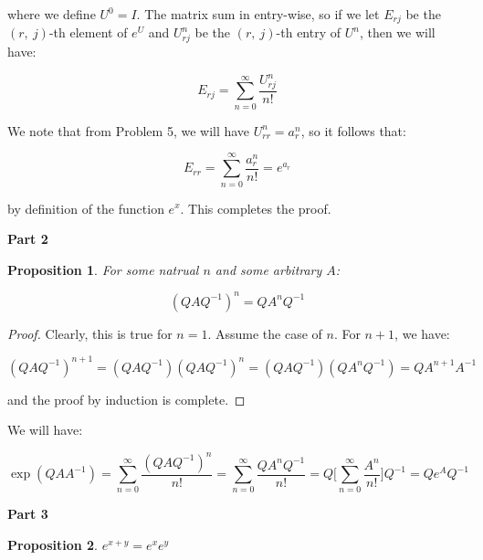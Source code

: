 \documentclass[10pt, oneside]{article}
\newtheorem{prop}{Proposition}
\begin{document}
    where we define $U^0 = I$. The matrix sum in entry-wise, so if we let $E_{rj}$ be the $(r, \ j)$-th element
    of $e^U$ and $U^n_{rj}$ be the $(r, \ j)$-th entry of $U^n$, then we will have:

    $$E_{rj} = \displaystyle\sum_{n = 0}^{\infty} \frac{U^{n}_{rj}}{n!}$$

    We note that from Problem 5, we will have $U^{n}_{rr} = a_{r}^n$, so it follows that:

    $$E_{rr} = \displaystyle\sum_{n = 0}^{\infty} \frac{a_{r}^n}{n!} = e^{a_r}$$

    by definition of the function $e^x$. This completes the proof.
    \newline

    \textbf{Part 2}
    \newline

    \begin{prop}
      For some natrual $n$ and some arbitrary $A$:

      $$(Q A Q^{-1})^n = Q A^n Q^{-1}$$
    \end{prop}

    \begin{proof}
      Clearly, this is true for $n = 1$. Assume the case of $n$. For $n + 1$, we have:

      $$(Q A Q^{-1})^{n + 1} = (Q A Q^{-1}) (Q A Q^{-1})^{n} = (Q A Q^{-1})(Q A^n Q^{-1}) = Q A^{n + 1} A^{-1}$$

      and the proof by induction is complete.
      \end{proof}

    We will have:

    $$\exp(Q A A^{-1}) = \displaystyle\sum_{n = 0}^{\infty} \frac{(Q A Q^{-1})^n}{n!} = \displaystyle\sum_{n = 0}^{\infty} \frac{Q A^n Q^{-1}}{n!} =
    Q \Big[ \displaystyle\sum_{n = 0}^{\infty} \frac{A^n}{n!} \Big] Q^{-1} = Q e^A Q^{-1}$$

    \textbf{Part 3}
    \newline

    \begin{prop}
      $e^{x + y} = e^x e^y$
    \end{prop}
\end{document}

